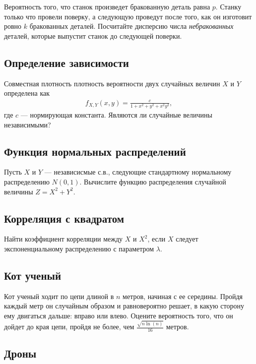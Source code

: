 \documentclass[12pt]{article}
\begin{document}
Вероятность того, что станок произведет бракованную деталь равна $p$. Станку только что провели поверку, а следующую проведут после того, как он изготовит ровно $k$ бракованных деталей. Посчитайте дисперсию числа \emph{небракованных} деталей, которые выпустит станок до следующей поверки.



\subsection{Определение зависимости}

Совместная плотность плотность вероятности двух случайных величин $X$ и $Y$ определена как
\begin{align*}
    f_{X, Y}(x, y) = \frac{c}{1 + x^2 + y^2 + x^2y^2},
\end{align*}
где $c$ --- нормирующая константа. Являются ли случайные величины независимыми?



\subsection{Функция нормальных распределений}

Пусть $X$ и $Y$ --- независисмые с.в., следующие стандартному нормальному распределению $N(0, 1)$. Вычислите функцию распределения случайной величины $Z = X^2 + Y^2$.



\subsection{Корреляция с квадратом}

Найти коэффициент корреляции между $X$ и $X^2$, если $X$ следует экспоненциальному распределению с параметром $\lambda$.



\subsection{Кот ученый}

Кот ученый ходит по цепи длиной в $n$ метров, начиная с ее середины. Пройдя каждый метр он случайным образом и равновероятно решает, в какую сторону ему двигаться дальше: вправо или влево. Оцените вероятность того, что он дойдет до края цепи, пройдя не более, чем $\frac{\sqrt{n \ln(n)}}{16}$ метров.



\subsection{Дроны}
\end{document}
